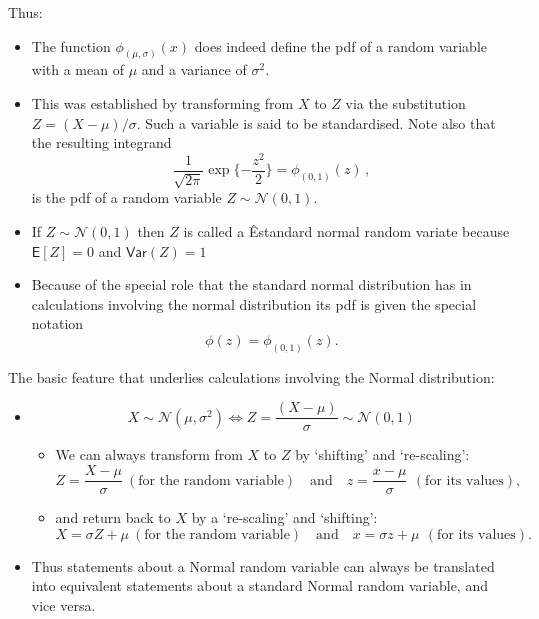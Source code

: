 \documentclass[notes=show,smaller,handout]{beamer}\usepackage[]{graphicx}\usepackage[]{color}
\newcommand{\N}{\mathcal{N}}
\newenvironment{stepitemize}{\begin{itemize}[<+->]}{\end{itemize} }
\begin{document}
\begin{frame}{\subsecname}
  Thus:
  \begin{itemize}
    \item The function $\phi_{(\mu,\sigma)}(x)$ does indeed define the pdf of a random variable with a mean of $\mu$ and a variance of $\sigma^2$.
  \item This was established by transforming from $X$ to $Z$ via the substitution $Z=(X-\mu)/\sigma$. Such a variable
  is said to be standardised. Note also that the resulting integrand
  $$
  \frac{1}{\sqrt{2\pi}}\exp{\{-\frac{z^2}{2}\}}=\phi_{(0,1)}(z)\,,
  $$
  is the pdf of a random variable $Z\sim \N(0,1)$.
  \item If $Z\sim \N(0,1)$ then $Z$ is called a \color{blue}Êstandard normal random variate \color{black} because
  $
  \textsf{E}[Z]=0$ and $\textsf{Var}(Z)=1$

  \item Because of the special role that the standard normal distribution has in
  calculations involving the normal distribution its pdf is given the special notation
  $$\phi(z)=\phi_{(0,1)}(z).$$
  \end{itemize}
\end{frame}

\begin{frame}{\subsecname}
  The basic feature that underlies calculations involving the Normal distribution:
  \begin{stepitemize}
  \item $$X\sim \N\left( \mu ,\sigma ^{2}\right)\Leftrightarrow Z=\frac{\left( X-\mu \right) }{\sigma }\sim \N\left( 0,1\right)$$
  \begin{stepitemize}
  \item We can always transform from $X$ to $Z$  by  `shifting' and `re-scaling':%
  \begin{equation*}
  Z=\frac{X-\mu }{\sigma } \ (\text{for the random variable}) \quad\mbox{and}\quad z=\frac{x-\mu }{\sigma }\,  \ (\text{for its values}) ,
  \end{equation*}
  \item and return back to $X$ by a `re-scaling' and `shifting':%
  \begin{equation*}
  X=\sigma Z+\mu  \ (\text{for the random variable}) \quad\mbox{and}\quad x=\sigma z+\mu\, \ (\text{for its values}) .
  \end{equation*}
  \end{stepitemize}
  \item Thus statements about a Normal random variable can always be translated into equivalent statements about a standard Normal random variable, and vice versa.
  \end{stepitemize}
\end{frame}
\end{document}
